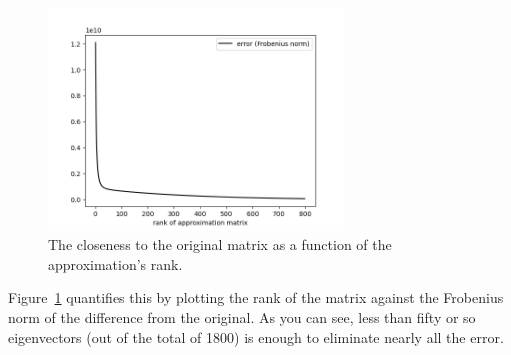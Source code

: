 \begin{alttitles}
\begin{figure}[H]
\centering
\includegraphics[width=0.7\textwidth]{frobenius.png}
\caption{The closeness to the original matrix as a function of the
approximation's rank.}
\label{fig:frobenius}
\end{figure}

Figure~\ref{fig:frobenius} quantifies this by plotting the rank of the matrix
against the Frobenius norm of the difference from the original. As you can see, 
less than fifty or so eigenvectors (out of the total of 1800) is enough to
eliminate nearly all the error.




\end{alttitles}
